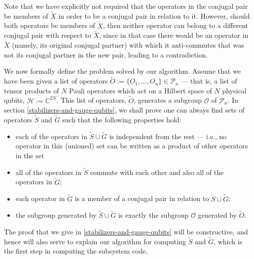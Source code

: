 \documentclass[twocolumn,showpacs,preprintnumbers,amsmath,amssymb,nofootinbib,pra,floatfix]{revtex4}
\begin{document}
Note that we have explicitly not required that the operators in the conjugal pair be members of $\tilde X$ in order to be a conjugal pair in relation to it.  However, should both operators be members of $\tilde X$, then neither operator can belong to a different conjugal pair with respect to $\tilde X$, since in that case there would be an operator in $\tilde X$ (namely, its original conjugal partner) with which it anti-commutes that was not its conjugal partner in the new pair, leading to a contradiction.

We now formally define the problem solved by our algorithm.  Assume that we have been given a list of operators $\tilde O :=\{O_1,\dots,O_n\}\in \mathcal{P}_n$ --- that is, a list of tensor products of $N$ Pauli operators which act on a Hilbert space of $N$ physical qubits, $\mathscr{H}:=\mathbb{C}^{2N}$.  This list of operators, $\tilde O$, generates a subgroup $\mathcal{O}$ of $\mathcal{P}_n$.  In section \ref{stabilizers-and-gauge-qubits}, we shall prove one can always find sets of operators $\tilde S$ and $\tilde G$ such that the following properties hold:
\begin{itemize}
\item each of the operators in $\tilde S \cup \tilde G$ is
  independent from the rest --- i.e., no operator in this (unioned) set can
  be written as a product of other operators in the set
\item all of the operators in $\tilde S$ commute with each other and
  also all of the operators in $\tilde G$;
\item each operator in $\tilde G$ is a member of a conjugal pair in relation to $\tilde S \cup \tilde G$;
\item the subgroup generated by $\tilde S \cup \tilde G$ is exactly
  the subgroup $\mathcal{O}$ generated by $\tilde O$.
\end{itemize}
The proof that we give in \ref{stabilizers-and-gauge-qubits} will be
constructive, and hence will also serve to explain our algorithm for
computing $\tilde S$ and $\tilde G$, which is the first step in
computing the subsystem code.
\end{document}
